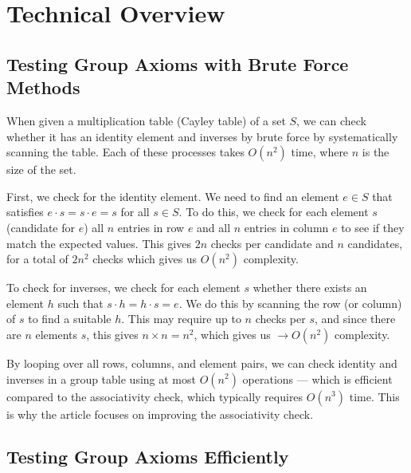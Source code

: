 \documentclass[sigconf]{acmart}
\begin{document}
\section{Technical Overview}
\subsection{Testing Group Axioms with Brute Force Methods}
When given a multiplication table (Cayley table) of a set $S$, we can check whether it has an identity element and inverses by brute force by systematically scanning the table. Each of these processes takes $O(n^2)$ time, where $n$ is the size of the set.

First, we check for the identity element. We need to find an element $e \in S$ that satisfies $e \cdot s = s \cdot e = s$ for all $s \in S$. To do this, we check for each element $s$ (candidate for $e$) all $n$ entries in row $e$ and all $n$ entries in column $e$ to see if they match the expected values. This gives $2n$ checks per candidate and $n$ candidates, for a total of $2n^2$ checks which gives us $O(n^2)$ complexity.

To check for inverses, we check for each element $s$ whether there exists an element $h$ such that $s \cdot h = h \cdot s = e$. We do this by scanning the row (or column) of $s$ to find a suitable $h$. This may require up to $n$ checks per $s$, and since there are $n$ elements $s$, this gives $n \times n = n^2$, which gives us $\to O(n^2)$ complexity.

By looping over all rows, columns, and element pairs, we can check identity and inverses in a group table using at most $O(n^2)$ operations — which is efficient compared to the associativity check, which typically requires $O(n^3)$ time. This is why the article focuses on improving the associativity check.

\subsection{Testing Group Axioms Efficiently}
\end{document}
